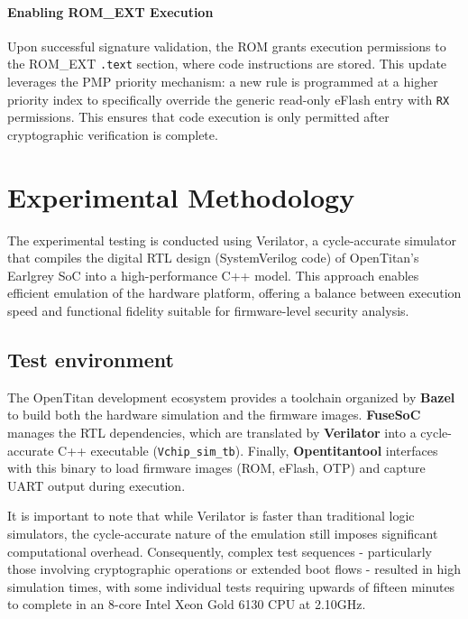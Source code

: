 \documentclass[10pt,a4paper,twocolumn,twoside]{article}
\begin{document}
\noindent

\paragraph{Enabling ROM\_EXT Execution}
Upon successful signature validation, the ROM grants execution permissions to the ROM\_EXT \texttt{.text} section, where code instructions are stored. This update leverages the PMP priority mechanism: a new rule is programmed at a higher priority index to specifically override the generic read-only eFlash entry with \texttt{RX} permissions. This ensures that code execution is only permitted after cryptographic verification is complete.

\section{Experimental Methodology}

The experimental testing is conducted using Verilator, a cycle-accurate simulator that compiles the digital RTL design (SystemVerilog code) of OpenTitan's Earlgrey SoC into a high-performance C++ model. This approach enables efficient emulation of the hardware platform, offering a balance between execution speed and functional fidelity suitable for firmware-level security analysis.

\subsection{Test environment}

The OpenTitan development ecosystem provides a toolchain organized by \textbf{Bazel} to build both the hardware simulation and the firmware images. \textbf{FuseSoC} manages the RTL dependencies, which are translated by \textbf{Verilator} into a cycle-accurate C++ executable (\texttt{Vchip\_sim\_tb}). Finally, \textbf{Opentitantool} interfaces with this binary to load firmware images (ROM, eFlash, OTP) and capture UART output during execution.

It is important to note that while Verilator is faster than traditional logic simulators, the cycle-accurate nature of the emulation still imposes significant computational overhead. Consequently, complex test sequences - particularly those involving cryptographic operations or extended boot flows - resulted in high simulation times, with some individual tests requiring upwards of fifteen minutes to complete in an 8-core Intel Xeon Gold 6130 CPU at 2.10GHz. 
\end{document}
